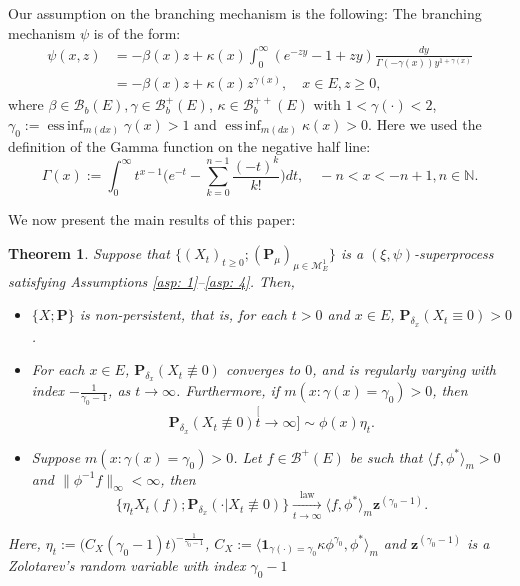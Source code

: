 \documentclass[12pt, a4paper]{amsart}
\newtheorem{thm}{Theorem}[section]
\theoremstyle{definition}
\newenvironment{asp}[1]{\renewcommand\theinnerasp{#1}\innerasp}{\endinnerasp}
\numberwithin{equation}{section}
\begin{document}
	Our assumption on the branching mechanism is the following:
\begin{asp}{4} \label{asp: 4}
	The branching mechanism $\psi$ is of 
	the form:
\[\begin{split}
	\psi(x,z)
	&= - \beta(x) z + \kappa(x) \int_0^\infty (e^{-z y} - 1+ z y) \frac{dy}{\Gamma(- \gamma(x)) y^{1+ \gamma(x)}}
	\\&= -\beta (x) z + \kappa(x) z^{\gamma(x)},
	\quad x\in E, z \geq 0,
\end{split}\]
	where $\beta \in \mathscr B_b(E), \gamma \in \mathscr B^+_b(E)$, $\kappa \in \mathscr B^{++}_b(E)$ with $1< \gamma(\cdot )<2$, $\gamma_0 := \operatorname{ess\,inf}_{m(dx)} \gamma(x)> 1$ and $\operatorname{ess\,inf}_{m(dx)}\kappa(x) > 0$.
\end{asp}
	Here we used the definition of the Gamma function on the negative half line:
\[\label{eq: definition of Gamma function}
	\Gamma(x)
	:= \int_0^\infty t^{x-1} \Big(e^{-t} - \sum_{k=0}^{n-1} \frac{(-t)^k}{k!}\Big) dt,
	\quad -n< x< -n+1, n\in \mathbb N.
\]
	
	We now present the main results of this paper:

\begin{thm}
\label{thm: main theorem}
	Suppose that $\{(X_t)_{t\geq 0}; (\mathbf P_\mu)_{\mu \in \mathcal M_E^1}\}$ is a $(\xi, \psi)$-superprocess satisfying 
Assumptions \ref{asp: 1}--\ref{asp: 4}. Then,
\begin{itemize}
	\item[(1)] $\{X; \mathbf P\}$ is non-persistent, that is, for each $t > 0$ and $x\in E$, $\mathbf P_{\delta_x}(X_t \equiv 0) > 0$.
	\item[(2)] For each $x\in E$, $\mathbf P_{\delta_x}(X_t \not \equiv 0)$ 
	converges to $0$, and is regularly varying with index $-\frac{1}{\gamma_0-1}$, as $t\to \infty$.
	Furthermore, if $m(x: \gamma (x)= \gamma_0)>0$, then
\[
	\mathbf P_{\delta_x}(X_t \not \equiv 0)
	\stackrel[t\to \infty]{}{\sim} \phi(x)\eta_t.
\]
	\item[(3)] Suppose $m( x:\gamma(x)=\gamma_0 )>0$.
	Let $f \in \mathscr B^+(E)$ be  such that $\langle f, \phi^* \rangle_m > 0$  and $\| \phi^{-1}f \|_\infty < \infty$, then
\[
	\{   \eta_t X_t(f) ; \mathbf P_{\delta_x}(\cdot | X_t \not \equiv 0) \}
	\xrightarrow[t\to \infty]{\operatorname{law}}
	\langle f, \phi^*\rangle_m \mathbf z^{(\gamma_0 - 1)}.
\]
\end{itemize}
	Here, $\eta_t := \big( C_X(\gamma_0 - 1) t \big)^{- \frac {1} {\gamma_0 - 1} }$, $C_X := \langle \mathbf 1_{\gamma(\cdot) = \gamma_0} \kappa \phi^{\gamma_0}, \phi^* \rangle_m$ and $\mathbf z^{(\gamma_0 - 1)}$ is a Zolotarev's random variable with index $\gamma_0 - 1$
\end{thm}
\end{document}
